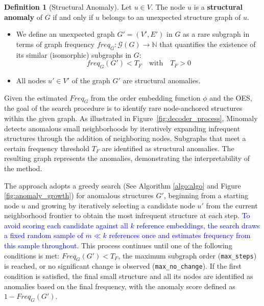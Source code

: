 \documentclass[preprint,12pt]{elsarticle}
\newcommand{\new}[1]{\textcolor{blue}{#1}}
\theoremstyle{plain}
\theoremstyle{definition}
\newtheorem{definition}{Definition}
\theoremstyle{remark}
\begin{document}
\begin{definition}[Structural Anomaly]
Let $u \in V$. The node $u$ is a \textbf{structural anomaly} of $G$ if and only if $u$ belongs to an unexpected structure graph of $u$.
\begin{itemize}
 \item We define an unexpected graph $G'=(V', E')$ in $G$ as a rare subgraph in terms of graph frequency $freq_G: \mathcal{G}(G) \to \mathbb{N}$ that quantifies the existence of its similar (isomorphic) subgraphs in $G$:
 \[
  freq_G(G') < T_F \quad \text{with} \quad T_F > 0
 \]
 \item All nodes $u' \in V'$ of the graph $G'$ are structural anomalies.
\end{itemize}
\end{definition}

Given the estimated $Freq_G$ from the order embedding function $\phi$ and the OES, the goal of the search procedure is to identify rare node-anchored structures within the given graph. As illustrated in Figure~\ref{fig:decoder_process}, Minomaly detects anomalous small neighborhoods by iteratively expanding infrequent structures through the addition of neighboring nodes. Subgraphs that meet a certain frequency threshold $T_F$ are identified as structural anomalies. The resulting graph represents the anomalies, demonstrating the interpretability of the method.

The approach adopts a greedy search (See Algorithm \ref{algo:algo} and Figure \ref{fig:anomaly_growth}) for anomalous structures $G'$, beginning from a starting node $u$ and growing by iteratively selecting a candidate node $u'$ from the current neighborhood frontier to obtain the most infrequent structure at each step. \new{To avoid scoring each candidate against all $k$ reference embeddings, the search draws a fixed random sample of $m \ll k$ references once and estimates frequency from this sample throughout.} This process continues until one of the following conditions is met: $Freq_G(G') < T_F$, the maximum subgraph order (\texttt{max\_steps}) is reached, or no significant change is observed (\texttt{max\_no\_change}). If the first condition is satisfied, the final small structure and all its nodes are identified as anomalies based on the final frequency, with the anomaly score defined as $1 - Freq_G(G')$.
\end{document}
